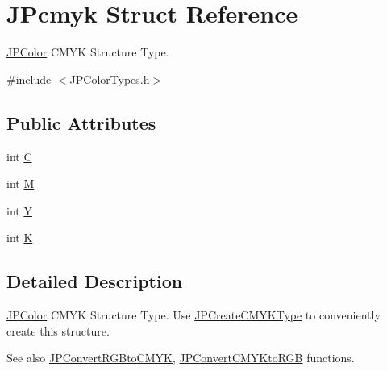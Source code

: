 \hypertarget{struct_j_pcmyk}{
\section{JPcmyk Struct Reference}
\label{struct_j_pcmyk}
}


\hyperlink{interface_j_p_color}{JPColor} CMYK Structure Type.  




{\ttfamily \#include $<$JPColorTypes.h$>$}

\subsection*{Public Attributes}
\begin{DoxyCompactItemize}
\item 
int \hyperlink{struct_j_pcmyk_a31b198bd6e353092dc4ca5fd489baf29}{C}
\item 
int \hyperlink{struct_j_pcmyk_a90de4545615a3622b5ea4f83d3ca3479}{M}
\item 
int \hyperlink{struct_j_pcmyk_a54bb8ef1c6b8d49f5aed98f5ad9e3053}{Y}
\item 
int \hyperlink{struct_j_pcmyk_aaae615286949bac30609a3a29a20e5fb}{K}
\end{DoxyCompactItemize}


\subsection{Detailed Description}
\hyperlink{interface_j_p_color}{JPColor} CMYK Structure Type. Use \hyperlink{_j_p_color_functions_8h_ace4eb5bbf6392366d0cc6ae57313d6d8}{JPCreateCMYKType} to conveniently create this structure. \begin{DoxySeeAlso}{See also}
\hyperlink{_j_p_color_convert_functions_8h_a8c9831bc0a46f817ca27293ee2c3136d}{JPConvertRGBtoCMYK}, \hyperlink{_j_p_color_convert_functions_8h_afbace75877e5f8a1e13cd3cd6862d5dc}{JPConvertCMYKtoRGB} functions. 
\end{DoxySeeAlso}


